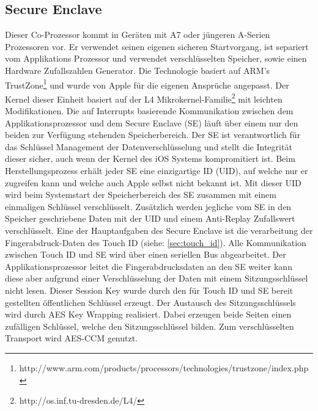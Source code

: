 	\subsection{Secure Enclave}\label{sec:secure_enclave}
		Dieser Co-Prozessor kommt in Geräten mit A7 oder jüngeren A-Serien Prozessoren
		vor. Er verwendet seinen eigenen sicheren Startvorgang, ist separiert vom
		Applikations Prozessor und verwendet verschlüsselten Speicher, sowie einen
		Hardware Zufallszahlen Generator. Die Technologie basiert auf ARM's
		TrustZone\footnote{http://www.arm.com/products/processors/technologies/trustzone/index.php}
		und wurde von Apple für die eigenen Ansprüche angepasst. Der Kernel dieser
		Einheit basiert auf der L4
		Mikrokernel-Familie\footnote{http://os.inf.tu-dresden.de/L4/} mit leichten
		Modifikationen. Die auf Interrupts basierende Kommunikation zwischen dem Applikationsprozessor und dem Secure Enclave (SE) läuft über
		einem nur den beiden zur Verfügung stehenden Speicherbereich. Der SE ist
		verantwortlich für das Schlüssel Management der Datenverschlüsselung und
		stellt die Integrität dieser sicher, auch wenn der Kernel des iOS Systems
		kompromitiert ist. Beim Herstellungsprozess erhält jeder SE eine einzigartige
		ID (UID), auf welche nur er zugreifen kann und welche auch Apple selbst nicht
		bekannt ist. Mit dieser UID wird beim Systemstart der Speicherbereich des SE
		zusammen mit einem einmaligen Schlüssel verschlüsselt. Zusätzlich werden
		jegliche vom SE in den Speicher geschriebene Daten mit der UID und einem
		Anti-Replay Zufallswert verschlüsselt. Eine der Hauptaufgaben des Secure
		Enclave ist die verarbeitung der Fingerabdruck-Daten des Touch
		ID (siehe: \ref{sec:touch_id}). Alle Kommunikation zwischen Touch ID und SE
		wird über einen seriellen Bus abgearbeitet. Der Applikationsprozessor leitet die Fingerabdrucksdaten an den
		SE weiter kann diese aber aufgrund einer Verschlüsselung der Daten mit einem
		Sitzungsschlüssel nicht lesen. Dieser Session Key wurde durch den für Touch ID
		und SE bereit gestellten öffentlichen Schlüssel erzeugt. Der Austausch des
		Sitzungsschlüssels wird durch AES Key Wrapping realisiert. Dabei erzeugen
		beide Seiten einen zufälligen Schlüssel, welche den Sitzungsschlüssel bilden.
		Zum verschlüsselten Transport wird AES-CCM genutzt.
